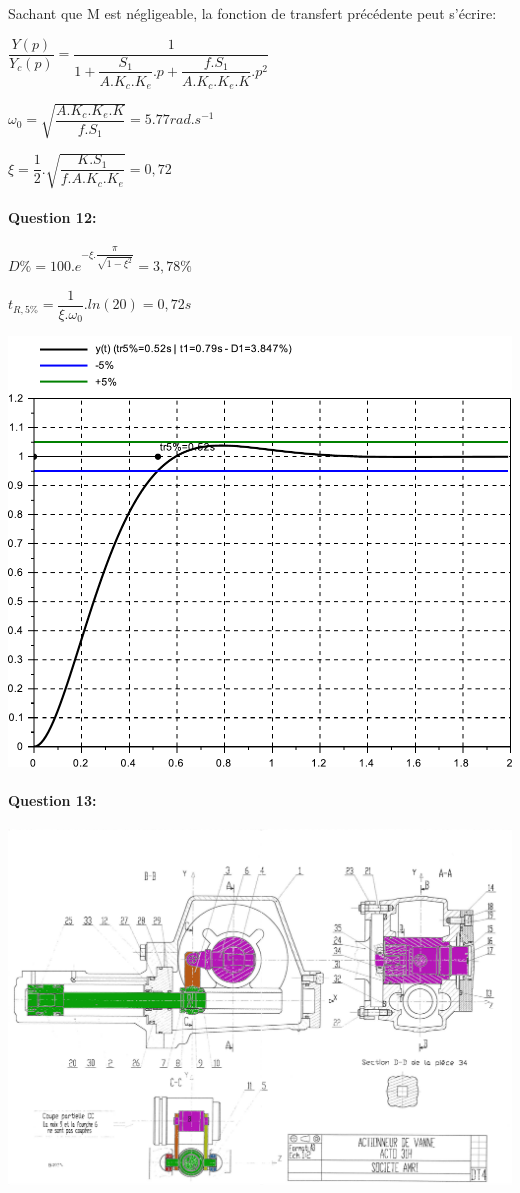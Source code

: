 Sachant que M est négligeable, la fonction de transfert précédente peut s'écrire:

$\dfrac{Y(p)}{Y_c(p)}=\dfrac{1}{1+\dfrac{S_1}{A.K_c.K_e}.p+\dfrac{f.S_1}{A.K_c.K_e.K}.p^2}$

$\omega_0=\sqrt{\dfrac{A.K_c.K_e.K}{f.S_1}}=5.77rad.s^{-1}$

$\xi=\dfrac{1}{2}.\sqrt{\dfrac{K.S_1}{f.A.K_c.K_e}}=0,72$

\paragraph{Question 12:} 

$D\%=100.e^{-\xi.\dfrac{\pi}{\sqrt{1-\xi^2}}}=3,78\%$

$t_{R,5\%}=\dfrac{1}{\xi.\omega_0}.ln(20)=0,72s$

\begin{center}
 \includegraphics[width=0.8\linewidth]{img/courbe_corrige}
\end{center}

\newpage

\paragraph{Question 13:} 

\begin{center}
 \includegraphics[width=0.8\linewidth]{img/Actionneur_vanne_corrige}
\end{center}

